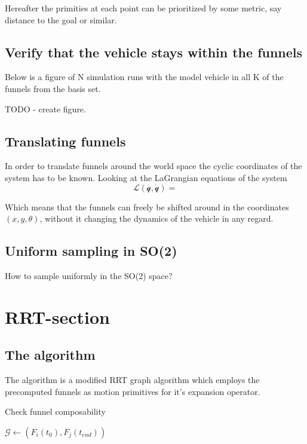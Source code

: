 Hereafter the primities at each point can be prioritized by some metric, say
distance to the goal or similar.

\subsection{Verify that the vehicle stays within the funnels}

Below is a figure of N simulation runs with the model vehicle in all K of the
funnels from the basis set.

TODO - create figure.

\subsection{Translating funnels}

In order to translate funnels around the world space the cyclic coordinates of
the system has to be known. Looking at the LaGrangian equations of the system
\begin{equation}
  \mathcal{L(q,\dot{q})} = 
\end{equation}

Which means that the funnels can freely be shifted around in the coordinates
\(\left( x, y, \theta \right)\), without it changing the dynamics of the vehicle
in any regard.

\subsection{Uniform sampling in SO(2)}

How to sample uniformly in the SO(2) space?


\section{RRT-section}

\subsection{The \rrtfunnel{} algorithm}

The \rrtfunnel{} algorithm is a modified \ac{RRT} graph algorithm which employs
the precomputed funnels as motion primitives for it's expansion operator.

\begin{algorithm}
  \caption{Check funnel composability}
  \label{alg:create-funnel-graph}
  \DontPrintSemicolon \SetAlgoNoLine

   

   {  {
           { \(\mathcal{G}
            \leftarrow{} \left( F_{i}(t_{0}), F_{j}(t_{end}) \right)\) }
      \; }\; }\;

\end{algorithm}
